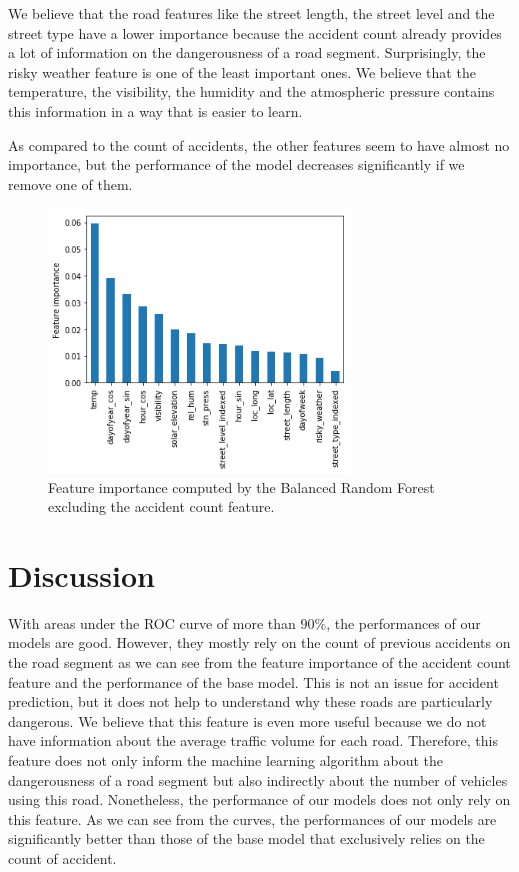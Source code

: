 \documentclass[conference]{IEEEtran}
\begin{document}
We believe that the road features like the street length, the street level and the street type have a lower importance because the accident count already provides a lot of information on the dangerousness of a road segment. Surprisingly, the risky weather feature is one of the least important ones. We believe that the temperature, the visibility, the humidity and the atmospheric pressure contains this information in a way that is easier to learn. 

As compared to the count of accidents, the other features seem to have almost no
importance, but the performance of the model decreases significantly if we
remove one of them. 

\begin{figure}[htbp]
\centerline{\includegraphics[height=7cm, keepaspectratio]{Figures/brf_fi_nocount.png}}
\caption{Feature importance computed by the Balanced Random Forest excluding the accident count feature.}
\label{feature importances}
\end{figure}


\section{Discussion}
\label{sec:discussion}

With areas under the ROC curve of more than $90\%$, the performances of our models are good.
However, they mostly rely on the count of previous accidents on the road segment as we can see from the feature importance of the accident count feature and the performance of the base model.
This is not an issue for accident prediction, but it does not help to 
understand why these roads are particularly dangerous. We believe that
this feature is even more useful because we do not have information
about the average traffic volume for each road. Therefore, this feature does
not only inform the machine learning algorithm about the dangerousness of a road
segment but also indirectly about the number of vehicles using this road.
Nonetheless, the performance of our models does not only rely on this feature.
As we can see from the curves, the performances of our models are significantly
better than those of the base model that exclusively relies on the count of accident.
\end{document}
